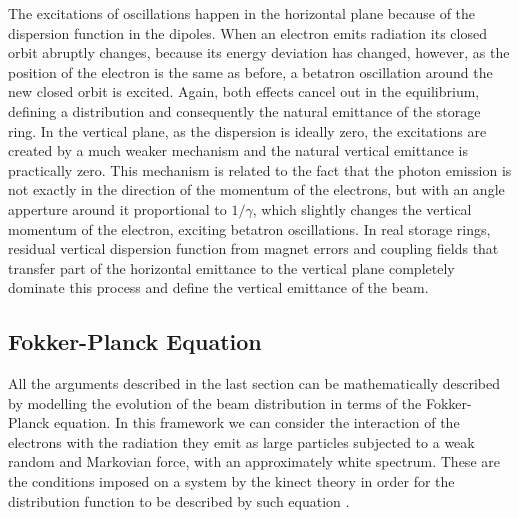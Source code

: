     The excitations of oscillations happen in the horizontal plane because of the dispersion function in the dipoles. When an electron emits radiation its closed orbit abruptly changes, because its energy deviation has changed, however, as the position of the electron is the same as before, a betatron oscillation around the new closed orbit is excited. Again, both effects cancel out in the equilibrium, defining a distribution and consequently the natural emittance of the storage ring. In the vertical plane, as the dispersion is ideally zero, the excitations are created by a much weaker mechanism and the natural vertical emittance is practically zero. This mechanism is related to the fact that the photon emission is not exactly in the direction of the momentum of the electrons, but with an angle apperture around it proportional to $1/\gamma$, which slightly changes the vertical momentum of the electron, exciting betatron oscillations. In real storage rings, residual vertical dispersion function from magnet errors and coupling fields that transfer part of the horizontal emittance to the vertical plane completely dominate this process and define the vertical emittance of the beam.

\subsection{Fokker-Planck Equation}\label{ssec:fokker_planck_equation}

	All the arguments described in the last section can be mathematically described by modelling the evolution of the beam distribution in terms of the Fokker-Planck equation. In this framework we can consider the interaction of the electrons with the radiation they emit as large particles subjected to a weak random and Markovian force, with an approximately white spectrum. These are the conditions imposed on a system by the kinect theory in order for the distribution function to be described by such equation \cite{landau, Wang1945, zwanzig}.

